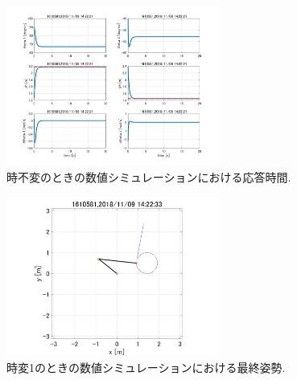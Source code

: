 \documentclass[twocolumn, 10pt,a4j]{jsarticle}
\begin{document}
\begin{enumerate}
        \begin{figure}[H]
          \begin{center}
            \includegraphics[width=7cm]{../img/kadai45/jpg_hand_zifuhen_auto_zikan.jpg}
            \caption{時不変のときの数値シミュレーションにおける応答時間.}
          \end{center}
        \end{figure}
        \begin{figure}[H]
          \begin{center}
            \includegraphics[width=7cm]{../img/kadai45/jpg_hand_zihen_saisyu_sise_1.jpg}
            \caption{時変1のときの数値シミュレーションにおける最終姿勢.}
          \end{center}
        \end{figure}
        

\end{enumerate}
\end{document}
